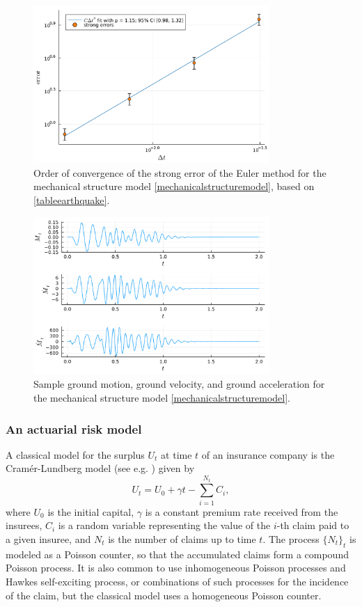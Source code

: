 \documentclass[reqno,12pt]{amsart}
\theoremstyle{plain} %
\theoremstyle{definition} %
\begin{document}
\begin{figure}[htb]
    \centerline{\includegraphics[width=0.8\textwidth]{img/order_earthquake.pdf}}
    \caption{Order of convergence of the strong error of the Euler method for the mechanical structure model \cref{mechanicalstructuremodel}, based on \cref{tableearthquake}.}
    \label{figearthquake}
\end{figure}

\begin{figure}[htb]
    \centerline{\includegraphics[width=0.8\textwidth]{img/noise_earthquake.pdf}}
    \caption{Sample ground motion, ground velocity, and ground acceleration for the mechanical structure model \cref{mechanicalstructuremodel}.}
    \label{figearthquakenoise}
\end{figure}

\subsubsection{An actuarial risk model}

A classical model for the surplus $U_t$ at time $t$ of an insurance company is the Cram\'er-Lundberg model (see e.g. \cite{GerberShiu1998}) given by
\[
  U_t = U_0 + \gamma t - \sum_{i=1}^{N_t} C_i,
\]
where $U_0$ is the initial capital, $\gamma$ is a constant premium rate received from the insurees, $C_i$ is a random variable representing the value of the $i$-th claim paid to a given insuree, and $N_t$ is the number of claims up to time $t$. The process $\{N_t\}_t$ is modeled as a Poisson counter, so that the accumulated claims form a compound Poisson process. It is also common to use inhomogeneous Poisson processes and Hawkes self-exciting process, or combinations of such processes for the incidence of the claim, but the classical model uses a homogeneous Poisson counter.
\end{document}
